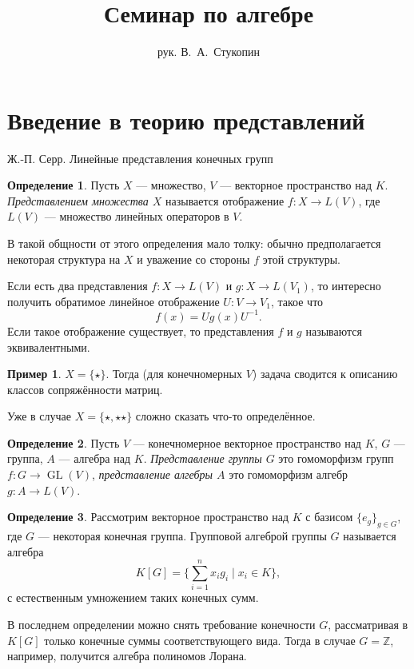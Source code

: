 \documentclass[12pt]{article}%
\title{Семинар по алгебре}
\author{рук. В.~А.~Стукопин}
\date{}
\newcommand{\Z}{\ensuremath{\mathbb Z}}
\DeclareMathOperator{\GL}{GL}
\theoremstyle{remark}
\theoremstyle{definition}
\newtheorem{Ex}{Пример}
\newtheorem{Def}{Определение}[section]
\begin{document}
\section{Введение в теорию представлений}
\begin{thebibliography}{9}
Ж.-П. Серр. Линейные представления конечных групп
\end{thebibliography}

\begin{Def}
Пусть $X$ — множество, $V$ — векторное пространство над $K$.
\emph{Представлением множества $X$} называется отображение $f\colon X \to L(V)$,
где $L(V)$ — множество линейных операторов в $V$.
\end{Def}
В такой общности от этого определения мало толку: обычно предполагается
некоторая структура на $X$ и уважение со стороны $f$ этой структуры.

Если есть два представления $f\colon X \to L(V)$ и $g\colon X \to L(V_1)$, то
интересно получить обратимое линейное отображение $U\colon V \to V_1$, такое что
\[
    f(x) = U g(x) U^{-1}.
\]
Если такое отображение существует, то представления $f$ и $g$ называются
эквивалентными.
\begin{Ex}
$X = \{ \star \}$. Тогда (для конечномерных $V$) задача сводится к описанию
классов сопряжённости матриц.
\end{Ex}

Уже в случае $X = \{ \star, \star\star \}$ сложно сказать что-то определённое. 

\begin{Def}
Пусть $V$ — конечномерное векторное пространство над $K$, $G$ — группа, $A$ —
алгебра над $K$. \emph{Представление группы $G$} это гомоморфизм групп $f \colon
G \to \GL(V)$, \emph{представление алгебры $A$} это гомоморфизм алгебр $g
\colon A \to L(V)$.
\end{Def}

\begin{Def}
Рассмотрим векторное пространство над $K$ с базисом $\{ e_g \}_{g \in G}$, где
$G$ — некоторая конечная группа. Групповой алгеброй группы $G$ называется
алгебра
\[
    K[G] = \{ \sum_{i = 1}^n x_i g_i \mid x_i \in K \},
\]
с естественным умножением таких конечных сумм. 
\end{Def}
В последнем определении можно снять требование конечности $G$, рассматривая в
$K[G]$ только конечные суммы соответствующего вида. Тогда в случае $G=\Z$, 
например, получится алгебра полиномов Лорана.
\end{document}
